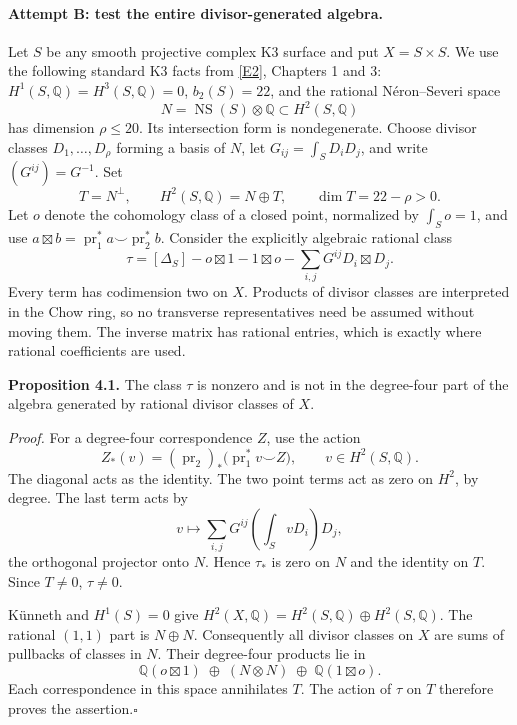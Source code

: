 \documentclass[11pt]{article}
\begin{document}
\paragraph{Attempt B: test the entire divisor-generated algebra.}
Let $S$ be any smooth projective complex K3 surface and put $X=S\times S$.
We use the following standard K3 facts from \href{https://www.math.uni-bonn.de/people/huybrech/K3Global.pdf}{[E2]}, Chapters 1 and 3:
$H^1(S,\mathbb Q)=H^3(S,\mathbb Q)=0$, $b_2(S)=22$, and the rational
N\'eron--Severi space
\[
 N=\operatorname{NS}(S)\otimes\mathbb Q\subset H^2(S,\mathbb Q)
\]
has dimension $\rho\le20$. Its intersection form is nondegenerate.
Choose divisor classes $D_1,\ldots,D_\rho$ forming a basis of $N$, let
$G_{ij}=\int_S D_iD_j$, and write $(G^{ij})=G^{-1}$. Set
\[
 T=N^\perp,\qquad H^2(S,\mathbb Q)=N\oplus T,
 \qquad \dim T=22-\rho>0.
\]
Let $o$ denote the cohomology class of a closed point, normalized by
$\int_S o=1$, and use $a\boxtimes b=\operatorname{pr}_1^*a\smile
\operatorname{pr}_2^*b$. Consider the explicitly algebraic rational class
\begin{equation}\label{cont4:tau}
 \tau=[\Delta_S]-o\boxtimes1-1\boxtimes o
                 -\sum_{i,j}G^{ij}D_i\boxtimes D_j.
\end{equation}
Every term has codimension two on $X$. Products of divisor classes are
interpreted in the Chow ring, so no transverse representatives need be
assumed without moving them. The inverse matrix has rational entries,
which is exactly where rational coefficients are used.

\textbf{Proposition 4.1.} The class $\tau$ is nonzero and is not in the
degree-four part of the algebra generated by rational divisor classes of $X$.

\emph{Proof.} For a degree-four correspondence $Z$, use the action
\[
 Z_*(v)=(\operatorname{pr}_2)_*
                 \bigl(\operatorname{pr}_1^*v\smile Z\bigr),
 \qquad v\in H^2(S,\mathbb Q).
\]
The diagonal acts as the identity. The two point terms act as zero on
$H^2$, by degree. The last term acts by
\[
 v\longmapsto\sum_{i,j}G^{ij}\left(\int_S vD_i\right)D_j,
\]
the orthogonal projector onto $N$. Hence $\tau_*$ is zero on $N$ and the
identity on $T$. Since $T\ne0$, $\tau\ne0$.

K\"unneth and $H^1(S)=0$ give
$H^2(X,\mathbb Q)=H^2(S,\mathbb Q)\oplus H^2(S,\mathbb Q)$.
The rational $(1,1)$ part is $N\oplus N$. Consequently all divisor
classes on $X$ are sums of pullbacks of classes in $N$. Their degree-four
products lie in
\begin{equation}\label{cont4:divspan}
 \mathbb Q(o\boxtimes1)\;\oplus\;(N\otimes N)\;
                       \oplus\;\mathbb Q(1\boxtimes o).
\end{equation}
Each correspondence in this space annihilates $T$. The action of $\tau$
on $T$ therefore proves the assertion.\hfill$\square$
\end{document}
